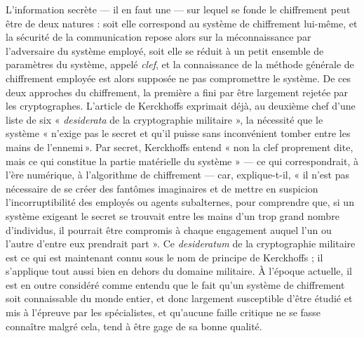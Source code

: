 L’information secrète --- il en faut une --- sur lequel se fonde le chiffrement peut être de deux natures : soit elle
correspond au système de chiffrement lui-même, et la sécurité de la communication repose alors
sur la méconnaissance par l’adversaire du système employé, soit elle se réduit à un petit ensemble de
paramètres du système, appelé {\it clef}, et la connaissance de la méthode générale de chiffrement
employée est alors supposée ne pas compromettre le système.
De ces deux approches du chiffrement, la première a fini par être largement rejetée par les
cryptographes.
L’article de Kerckhoffs exprimait déjà, au deuxième chef d’une liste de six « {\it desiderata\/} de
la cryptographie militaire », la nécessité que le système « n’exige pas le secret et qu’il puisse
sans inconvénient tomber entre les mains de l’ennemi ».
Par secret, Kerckhoffs entend « non la clef proprement dite, mais ce qui constitue la partie
matérielle du système » --- ce qui correspondrait, à l’ère numérique, à l'algorithme de chiffrement
--- car, explique-t-il, « il n’est pas nécessaire de se créer des fantômes imaginaires et de mettre
en suspicion l’incorruptibilité des employés ou agents subalternes, pour comprendre que, si un
système exigeant le secret se trouvait entre les mains d’un trop grand nombre d’individus, il
pourrait être compromis à chaque engagement auquel l’un ou l’autre d’entre eux prendrait part ».
Ce {\it desideratum} de la cryptographie militaire est ce qui est maintenant connu sous le nom de
principe de Kerckhoffs ; il s’applique tout aussi bien en dehors du domaine militaire.
À l’époque actuelle, il est en outre considéré comme entendu que le fait qu’un système de
chiffrement soit connaissable du monde entier, et donc largement susceptible d’être étudié et mis à
l’épreuve par les spécialistes, et qu’aucune faille critique ne se fasse connaître malgré cela, tend
à être gage de sa bonne qualité.

